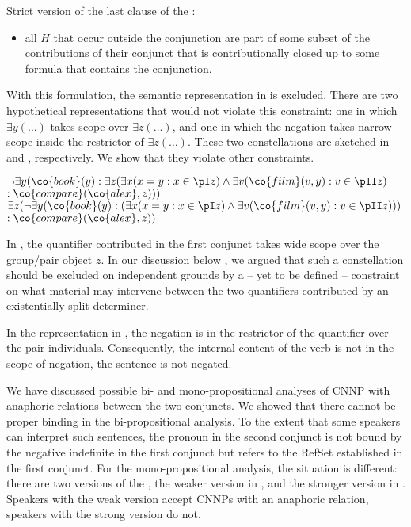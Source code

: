 \documentclass[output=paper]{langsci/langscibook}
\begin{document}
\ea Strict version of the last clause of the \CCB{}:\label{cic-last-strict}
\begin{itemize}
    \item all $H$ that occur outside the conjunction are part of some
subset of the contributions of their conjunct that is contributionally
closed up to some formula that contains the conjunction.
\end{itemize}
\z 

With this formulation, the semantic representation in  is excluded.
There are two hypothetical representations that would not violate this constraint: one in which $\exists y (\ldots)$ takes scope over $\exists z (\ldots)$, and one in which the negation takes narrow scope inside the restrictor of $\exists z (\ldots)$. These two constellations are sketched in  and , respectively.
We show that they violate other constraints.


\ea
\begin{xlist}
\ex 
$\lnot \exists y (\co{book}(y) : \exists z (\exists x (x=y: x \in \pI z) \land \exists v (\co{film}(v,y) : v \in \pII z)$\\ 
\hspace*{\fill}$ : 
\co{compare}(\co{alex}, z)))$\label{NotExEx}
\ex
$\exists z (\lnot \exists y (\co{book}(y) : 
(\exists x (x=y : x \in \pI z)
\land \exists v (\co{film}(v,y) : v \in  \pII z) 
))$\\ 
\hspace*{\fill}$: \co{compare}(\co{alex},z))$\label{ExNotEx}
\end{xlist}
\z

In  , the quantifier contributed in the first conjunct takes wide scope over the group/pair object $z$. 
In our discussion below , we argued that such a constellation should be excluded on independent grounds by a -- yet to be defined -- constraint on what material may intervene between the two quantifiers contributed by  an existentially split determiner.

In the representation in , the negation is in the restrictor of the quantifier over the pair individuals.
Consequently, the internal content of the verb is not in the scope of negation, the sentence is not negated. 

We have discussed possible bi- and mono-propositional analyses of CNNP with anaphoric relations between the two conjuncts. 
We showed that there cannot be proper binding in the bi-propositional analysis. 
To the extent that some speakers can interpret such sentences, the pronoun in the second conjunct is not bound by the negative indefinite in the first conjunct but refers to the RefSet established in the first conjunct. 
For the mono-propositional analysis, the situation is different: there are two versions of the \CCB, the weaker version in , and the stronger version in . 
Speakers with the weak version accept CNNPs with an anaphoric relation, speakers with the strong version do not.
\end{document}
